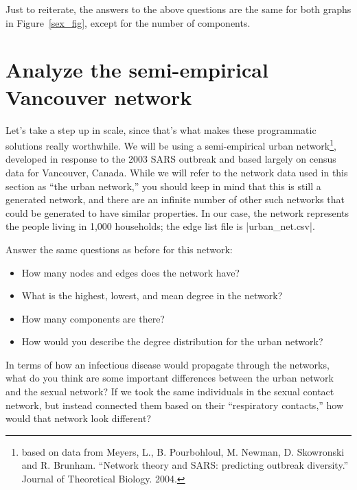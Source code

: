 \documentclass{article}
\begin{document}
Just to reiterate, the answers to the above questions are the same for both graphs in Figure~\ref{sex_fig}, except for the number of components.

\section{Analyze the semi-empirical Vancouver network}
Let's take a step up in scale, since that's what makes these programmatic solutions 
really worthwhile. We will be using a semi-empirical urban network\footnote{based on data from Meyers, L., B. Pourbohloul,
 M. Newman, D. Skowronski and R. Brunham. ``Network theory and SARS: predicting outbreak diversity.'' Journal of Theoretical Biology. 2004.},
developed in response to the 2003 SARS outbreak and based largely on census data for
Vancouver, Canada.  While we will refer to the network data used in this section
as ``the urban network,'' you should keep in mind that this is still a generated
network, and there are an infinite number of other such networks that could be
generated to have similar properties.  In our case, the network represents the
people living in 1,000 households; the edge list file is |urban_net.csv|.

Answer the same questions as before for this network:
\begin{itemize}
 \item How many nodes and edges does the network have?
 \item What is the highest, lowest, and mean degree in the network?
 \item How many components are there?
 \item How would you describe the degree distribution for the urban network?
\end{itemize}

In terms of how an infectious disease would propagate through the networks, what do you think are some important differences between 
the urban network and the sexual network? If we took the same individuals in the sexual contact network, but instead connected them based 
on their ``respiratory contacts,'' how would that network look different?
\end{document}
